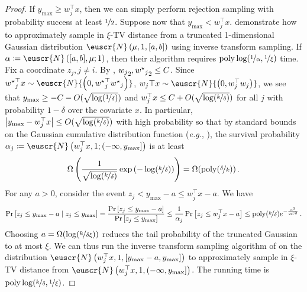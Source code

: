\documentclass[11pt,letterpaper]{article}
\theoremstyle{plain}
\theoremstyle{definition}
\theoremstyle{remark}
\def\abs#1{\left| #1 \right|}
\newcommand{\inparen}[1]{\ensuremath{\left(#1\right)}}
\newcommand{\insquare}[1]{\ensuremath{\left[#1\right]}}
\let\norm\relax
\newcommand{\norm}[1]{\ensuremath{\left\lVert #1 \right\rVert}}
\newcommand{\nfrac}[2]{\nicefrac{#1}{#2}}
\newcommand{\poly}{\mathrm{poly}}
\newcommand{\customcal}[1]{\euscr{#1}}
\newcommand{\cN}{\customcal{N}}
\newcommand{\eg}{\emph{e.g.}}
\newcommand{\normal}[2]{\cN{\inparen{#1,#2}}}
\newcommand{\truncatedNormal}[3]{\cN\inparen{#1,#2,#3}}
\newcommand{\normalMass}[3]{\cN\inparen{#1, #2; #3}}
\newcommand{\wstar}{{w^\star}}
\newcommand{\ymax}{y_{\max}}
\begin{document}
{{\begin{proof}
        If $\ymax\geq w_j^\top x$,
        then we can simply perform rejection sampling with probability success at least $\nfrac12$.
        Suppose now that $\ymax< w_j^\top x$.
        \cite[Lemma 12]{daskalakis2019computationally} demonstrate how to approximately sample in $\xi$-TV distance from a truncated 1-dimensional Gaussian distribution $\truncatedNormal{\mu}{1}{[a, b]}$
        using inverse transform sampling.
        If $\alpha \coloneqq \normalMass{[a, b]}{\mu}{1}$,
        then their algorithm requires $\poly\log(\nfrac1\alpha, \nfrac1\xi)$ time.
        Fix a coordinate $z_j, j\neq i$.
        By ,
        $\norm{w_j}_2, \norm{\wstar_j}_2\leq C$.
        Since $\wstar_j^\top x\sim \normal{0}{\wstar_j^\top\wstar_j}$,
        $w_j\top x\sim \normal{0}{w_j^\top w_j}$,
        we see that $\ymax \geq -C-O(\sqrt{\log(\nfrac{1}{\delta})})$ and $w_j^\top x\leq C+O(\sqrt{\log(\nfrac{k}{\delta})})$ for all $j$
        with probability $1-\delta$ over the covariate $x$.
        In particular,
        $\abs{\ymax - w_j^\top x}\leq O(\sqrt{\log(\nfrac{k}{\delta})})$ with high probability
        so that by standard bounds on the Gaussian cumulative distribution function (\eg{}, \cite[Section 2.3]{kantor2015mathematics}),
        the survival probability $\alpha_j\coloneqq \normalMass{w_j^\top x}{1}{(-\infty, \ymax]}$
        is at least
        \[
            \Omega\inparen{\frac1{\sqrt{\log(\nfrac{k}{\delta})}} \exp\inparen{-\log(\nfrac{k}{\delta})}}
            = \Omega(\poly(\nfrac\delta{k}))\,.
        \]
        For any $a>0$,
        consider the event $z_j < \ymax-a \leq w_j^\top x - a$.
        We have
        \begin{align*}
            \Pr\insquare{z_j \leq \ymax - a\mid z_j\leq \ymax}
            = \frac{\Pr\insquare{z_j\leq \ymax-a}}{\Pr\insquare{z_j\leq \ymax}}
            \leq \frac1{\alpha_j} \Pr\insquare{z_j\leq w_j^\top x-a}
            \leq \poly(\nfrac{k}\delta) e^{-\frac{a^2}{2C^2}}\,.
        \end{align*}
        Choosing $a = \Omega(\log(\nfrac{k}{\delta\xi}))$ reduces the tail probability of the truncated Gaussian to at most $\xi$.
        We can thus run the inverse transform sampling algorithm of \cite{daskalakis2019computationally}
        on the distribution $\truncatedNormal{w_j^\top x}{1}{[\ymax-a, \ymax]}$ to approximately sample in $\xi$-TV distance from $\truncatedNormal{w_j^\top x}{1}{(-\infty, \ymax]}$.
        The running time is $\poly\log(\nfrac{k}\delta, \nfrac1\xi)$.


\end{proof}}}
\end{document}
